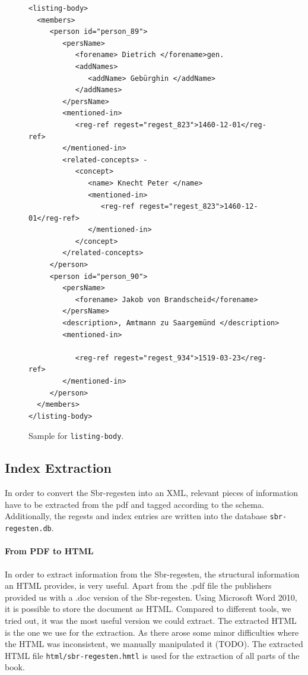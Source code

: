 \begin{figure}[H]
\begin{verbatim}
<listing-body>
  <members>
     <person id="person_89">
        <persName>
           <forename> Dietrich </forename>gen.
           <addNames>
              <addName> Gebürghin </addName>
           </addNames>
        </persName>
        <mentioned-in>
           <reg-ref regest="regest_823">1460-12-01</reg-ref>
        </mentioned-in>
        <related-concepts> -
           <concept>
              <name> Knecht Peter </name>
              <mentioned-in>
                 <reg-ref regest="regest_823">1460-12-01</reg-ref>
              </mentioned-in>
           </concept>
        </related-concepts>
     </person>
     <person id="person_90">
        <persName>
           <forename> Jakob von Brandscheid</forename>
        </persName>
        <description>, Amtmann zu Saargemünd </description>
        <mentioned-in>

           <reg-ref regest="regest_934">1519-03-23</reg-ref>
        </mentioned-in>
     </person>
  </members>
</listing-body>
\end{verbatim}
\label{fig:listing-body-xml}
\caption{Sample for \texttt{listing-body}.}
\end{figure}


\subsection{Index Extraction}
In order to convert the Sbr-regesten into an XML, relevant pieces of information have to be extracted from the pdf and tagged according to the schema. Additionally, the regests and index entries are written into the database \texttt{sbr-regesten.db}.

\paragraph{From PDF to HTML}
In order to extract information from the Sbr-regesten, the structural information an HTML provides, is very useful. Apart from the .pdf file the publishers provided us with a .doc version of the Sbr-regesten. Using Microsoft Word 2010, it is possible to store the document as HTML. Compared to different tools, we tried out, it was the most useful version we could extract. The extracted HTML is the one we use for the extraction.
As there arose some minor difficulties where the HTML was inconsistent, we manually manipulated it (TODO).
The extracted HTML file \texttt{html/sbr-regesten.hmtl} is used for the extraction of all parts of the book.

